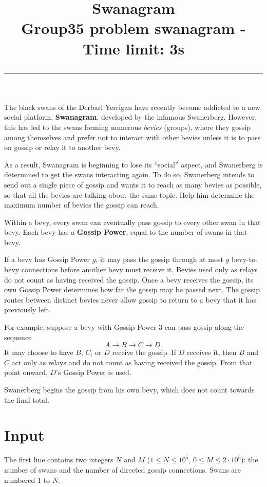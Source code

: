 \documentclass{article}
\title{\flushleft\textbf{Swanagram} \\[1.0em] \small Group35 problem \textbf{swanagram} - Time limit: 3s \noindent\rule{\textwidth}{0.4pt}}
\date{}
\begin{document}
\maketitle
\vspace{-90pt}
\section*{}
The black swans of the Derbarl Yerrigan have recently become addicted to a new social platform, \textbf{Swanagram}, developed by the infamous Swanerberg. However, this has led to the swans forming numerous \emph{bevies} (groups), where they gossip among themselves and prefer not to interact with other bevies unless it is to pass on gossip or relay it to another bevy.

As a result, Swanagram is beginning to lose its ``social'' aspect, and Swanerberg is determined to get the swans interacting again. To do so, Swanerberg intends to send out a single piece of gossip and wants it to reach as many bevies as possible, so that all the bevies are talking about the same topic. Help him determine the maximum number of bevies the gossip can reach.

Within a bevy, every swan can eventually pass gossip to every other swan in that bevy. Each bevy has a \textbf{Gossip Power}, equal to the number of swans in that bevy.

If a bevy has Gossip Power $g$, it may pass the gossip through at most $g$ bevy-to-bevy connections before another bevy must receive it. Bevies used only as relays do not count as having received the gossip. Once a bevy receives the gossip, its own Gossip Power determines how far the gossip may be passed next. The gossip routes between distinct bevies never allow gossip to return to a bevy that it has previously left.

For example, suppose a bevy with Gossip Power $3$ can pass gossip along the sequence
\[
A \rightarrow B \rightarrow C \rightarrow D.
\]
It may choose to have $B$, $C$, or $D$ receive the gossip. If $D$ receives it, then $B$ and $C$ act only as relays and do not count as having received the gossip. From that point onward, $D$'s Gossip Power is used.

Swanerberg begins the gossip from his own bevy, which does not count towards the final total.

\section*{Input}
The first line contains two integers $N$ and $M$ ($1 \le N \le 10^5$, $0 \le M \le 2 \cdot 10^5$): the number of swans and the number of directed gossip connections. Swans are numbered $1$ to $N$.
\end{document}
